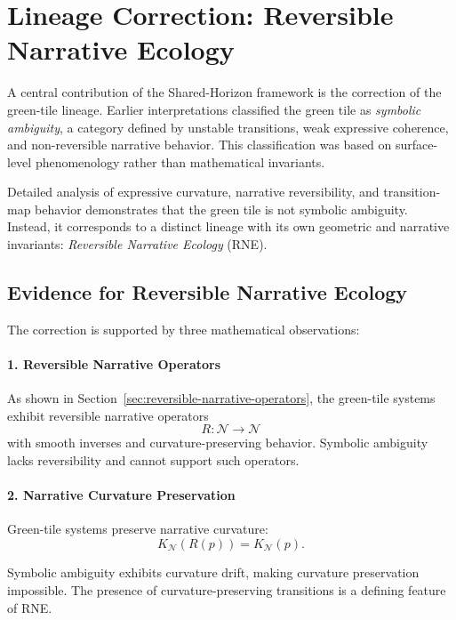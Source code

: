 
\section{Lineage Correction: Reversible Narrative Ecology}
\label{sec:lineage-correction}

A central contribution of the Shared-Horizon framework is the correction of the
green-tile lineage. Earlier interpretations classified the green tile as
\emph{symbolic ambiguity}, a category defined by unstable transitions, weak
expressive coherence, and non-reversible narrative behavior. This classification
was based on surface-level phenomenology rather than mathematical invariants.

Detailed analysis of expressive curvature, narrative reversibility, and
transition-map behavior demonstrates that the green tile is not symbolic
ambiguity. Instead, it corresponds to a distinct lineage with its own geometric
and narrative invariants: \emph{Reversible Narrative Ecology} (RNE).

\subsection{Evidence for Reversible Narrative Ecology}

The correction is supported by three mathematical observations:

\paragraph{1. Reversible Narrative Operators}

As shown in Section~\ref{sec:reversible-narrative-operators}, the green-tile
systems exhibit reversible narrative operators
\[
R : \mathcal{N} \rightarrow \mathcal{N}
\]
with smooth inverses and curvature-preserving behavior. Symbolic ambiguity lacks
reversibility and cannot support such operators.

\paragraph{2. Narrative Curvature Preservation}

Green-tile systems preserve narrative curvature:
\[
K_{\mathcal{N}}(R(p)) = K_{\mathcal{N}}(p).
\]

Symbolic ambiguity exhibits curvature drift, making curvature preservation
impossible. The presence of curvature-preserving transitions is a defining
feature of RNE.


